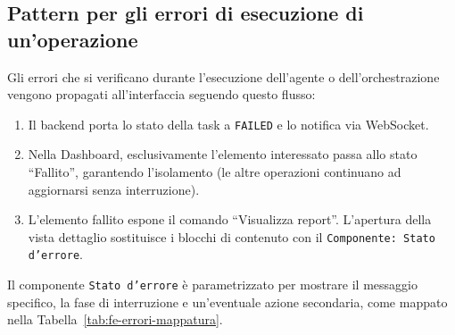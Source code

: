 \documentclass[11pt,a4paper]{article}
\begin{document}
\subsection{Pattern per gli errori di esecuzione di un'operazione}

Gli errori che si verificano durante l'esecuzione dell'agente o dell'orchestrazione vengono propagati all'interfaccia seguendo questo flusso:

\begin{enumerate}
    \item Il backend porta lo stato della task a \texttt{FAILED} e lo notifica via WebSocket.
    \item Nella Dashboard, esclusivamente l'elemento interessato passa allo stato ``Fallito'', garantendo l'isolamento (le altre operazioni continuano ad aggiornarsi senza interruzione).
    \item L'elemento fallito espone il comando ``Visualizza report''. L'apertura della vista dettaglio sostituisce i blocchi di contenuto con il \texttt{Componente: Stato d'errore}.
\end{enumerate}

Il componente \texttt{Stato d'errore} è parametrizzato per mostrare il messaggio specifico, la fase di interruzione e un'eventuale azione secondaria, come mappato nella Tabella~\ref{tab:fe-errori-mappatura}.
\end{document}
